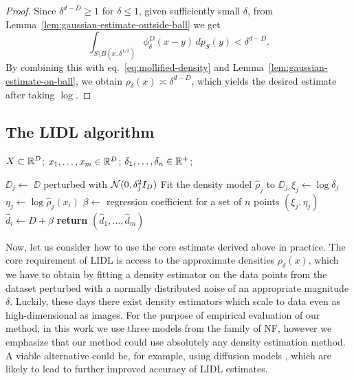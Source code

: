 \begin{proof}
    Since $\delta^{d-D}\geq 1$ for $\delta \leq 1$, given sufficiently small $\delta$, from Lemma~\ref{lem:gaussian-estimate-outside-ball} we get
    \begin{equation}
        \int_{S\setminus B(x,\delta^{1/2})} \phi^D_\delta(x-y)\, dp_S(y) < 
        \delta^{d-D}.
    \end{equation}
    By combining this with eq.~\eqref{eq:mollified-density} and Lemma~\ref{lem:gaussian-estimate-on-ball}, we obtain $\rho_\delta(x) \asymp \delta^{d-D}$, which yields the desired 
    estimate after taking $\log$.
\end{proof}



\subsection{The LIDL algorithm} 

\begin{algorithm}[b]
\caption{LIDL algorithm}
\label{alg:lidl}
\begin{algorithmic}
\REQUIRE
    $X\subset \mathbb{R}^D$; %
    $x_1,\dots, x_m \in\mathbb{R}^D$;  %
    $\delta_1, \dots, \delta_n \in \mathbb{R}^+$;  %
   
    
    
    
        \STATE $\DD_j \gets$ $\DD$ perturbed with $\mathcal{N}(0, \delta_j^2 I_D)$ 
        \STATE Fit the density model $\hat\rho_j$ to $\DD_j$
    \ENDFOR
            \STATE $\xi_j \gets \log\delta_j$
            \STATE $\eta_j \gets \log\hat\rho_j(x_i)$
        \ENDFOR
        \STATE $\beta \gets$  regression coefficient for a set of $n$ points $(\xi_j, \eta_j)$
        \STATE $\hat{d}_i \gets D + \beta$
    \ENDFOR
    \STATE \textbf{return} $(\hat{d}_1, \dots, \hat{d}_m)$
\end{algorithmic}
\end{algorithm}

Now, let us consider how to use the core estimate derived above in practice. 
The core requirement of LIDL is access to the approximate densities $\rho_\delta(x)$, which we have to obtain by fitting a density estimator on the data points from the dataset perturbed with a normally distributed noise of an appropriate magnitude $\delta$. 
Luckily, these days there exist density estimators which scale to data even as high-dimensional as images.
For the purpose of empirical evaluation of our method, in this work we use three models from the family of NF, however we emphasize that our method could use absolutely any density estimation method.
A viable alternative could be, for example, using diffusion models \citep{song2021maximum}, which are likely to lead to further improved accuracy of LIDL estimates.


